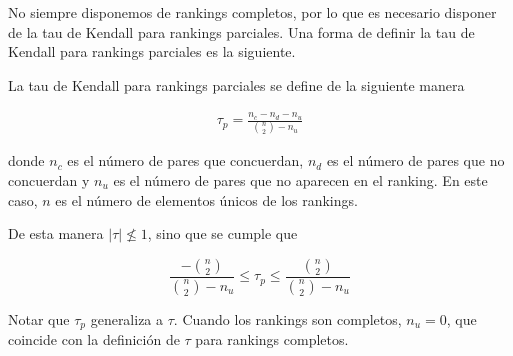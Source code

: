 No siempre disponemos de rankings completos, por lo que es necesario disponer de la tau de Kendall para rankings parciales. Una forma de definir la tau de Kendall para rankings parciales es la siguiente.

\begin{defi}

La tau de Kendall para rankings parciales se define de la siguiente manera

\begin{eqnarray}
\tau_p = \frac{n_c - n_d - n_u}{\binom{n}{2} - n_u}
\end{eqnarray}

donde $n_c$ es el número de pares que concuerdan, $n_d$ es el número de pares que no concuerdan y $n_u$ es el número de pares que no aparecen en el ranking. En este caso, $n$ es el número de elementos únicos de los rankings.

\end{defi}

De esta manera $|\tau| \not \leq 1$, sino que se cumple que

\begin{equation}
\dfrac{-\binom{n}{2}}{\binom{n}{2} - n_u} \leq \tau_p \leq \dfrac{\binom{n}{2}}{\binom{n}{2} - n_u}
\end{equation}

Notar que $\tau_p$ generaliza a $\tau$. Cuando los rankings son completos, $n_u = 0$, que coincide con la definición de $\tau$ para rankings completos.

